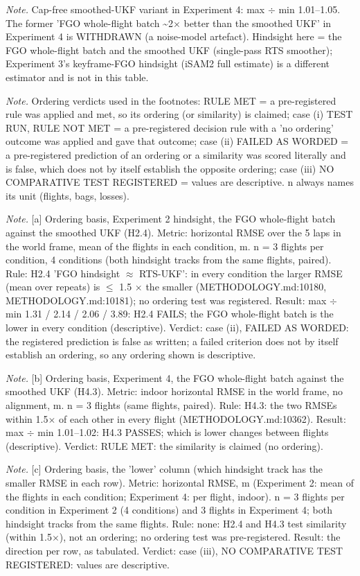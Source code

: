 \begin{table}[htbp]
\textit{Note.} Cap-free smoothed-UKF variant in Experiment 4: max $\div$ min 1.01--1.05. The former 'FGO whole-flight batch \textasciitilde{}2$\times$ better than the smoothed UKF' in Experiment 4 is WITHDRAWN (a noise-model artefact). Hindsight here = the FGO whole-flight batch and the smoothed UKF (single-pass RTS smoother); Experiment 3's keyframe-FGO hindsight (iSAM2 full estimate) is a different estimator and is not in this table.\par
\textit{Note.} Ordering verdicts used in the footnotes: RULE MET = a pre-registered rule was applied and met, so its ordering (or similarity) is claimed; case (i) TEST RUN, RULE NOT MET = a pre-registered decision rule with a 'no ordering' outcome was applied and gave that outcome; case (ii) FAILED AS WORDED = a pre-registered prediction of an ordering or a similarity was scored literally and is false, which does not by itself establish the opposite ordering; case (iii) NO COMPARATIVE TEST REGISTERED = values are descriptive. n always names its unit (flights, bags, losses).\par
\textit{Note.} [a] Ordering basis, Experiment 2 hindsight, the FGO whole-flight batch against the smoothed UKF (H2.4). Metric: horizontal RMSE over the 5 laps in the world frame, mean of the flights in each condition, m. n = 3 flights per condition, 4 conditions (both hindsight tracks from the same flights, paired). Rule: H2.4 'FGO hindsight $\approx$ RTS-UKF': in every condition the larger RMSE (mean over repeats) is $\le$ 1.5 $\times$ the smaller (METHODOLOGY.md:10180, METHODOLOGY.md:10181); no ordering test was registered. Result: max $\div$ min 1.31 / 2.14 / 2.06 / 3.89: H2.4 FAILS; the FGO whole-flight batch is the lower in every condition (descriptive). Verdict: case (ii), FAILED AS WORDED: the registered prediction is false as written; a failed criterion does not by itself establish an ordering, so any ordering shown is descriptive.\par
\textit{Note.} [b] Ordering basis, Experiment 4, the FGO whole-flight batch against the smoothed UKF (H4.3). Metric: indoor horizontal RMSE in the world frame, no alignment, m. n = 3 flights (same flights, paired). Rule: H4.3: the two RMSEs within 1.5$\times$ of each other in every flight (METHODOLOGY.md:10362). Result: max $\div$ min 1.01--1.02: H4.3 PASSES; which is lower changes between flights (descriptive). Verdict: RULE MET: the similarity is claimed (no ordering).\par
\textit{Note.} [c] Ordering basis, the 'lower' column (which hindsight track has the smaller RMSE in each row). Metric: horizontal RMSE, m (Experiment 2: mean of the flights in each condition; Experiment 4: per flight, indoor). n = 3 flights per condition in Experiment 2 (4 conditions) and 3 flights in Experiment 4; both hindsight tracks from the same flights. Rule: none: H2.4 and H4.3 test similarity (within 1.5$\times$), not an ordering; no ordering test was pre-registered. Result: the direction per row, as tabulated. Verdict: case (iii), NO COMPARATIVE TEST REGISTERED: values are descriptive.\par
\end{table}

